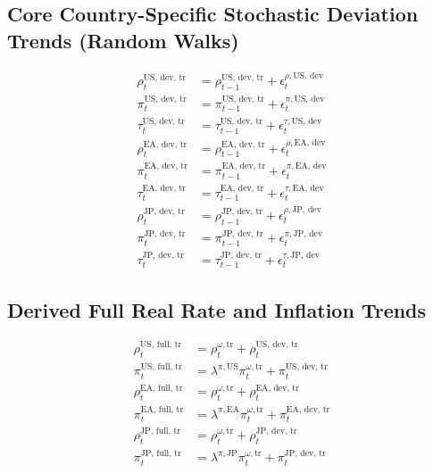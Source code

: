 \documentclass{article}
\begin{document}
\subsection*{Core Country-Specific Stochastic Deviation Trends (Random Walks)}
\begin{align}
    \rho^{\text{US, dev, tr}}_t &= \rho^{\text{US, dev, tr}}_{t-1} + \epsilon^{\rho, \text{US, dev}}_t \\
    \pi^{\text{US, dev, tr}}_t &= \pi^{\text{US, dev, tr}}_{t-1} + \epsilon^{\pi, \text{US, dev}}_t \\
    \tau^{\text{US, dev, tr}}_t &= \tau^{\text{US, dev, tr}}_{t-1} + \epsilon^{\tau, \text{US, dev}}_t \\
    \rho^{\text{EA, dev, tr}}_t &= \rho^{\text{EA, dev, tr}}_{t-1} + \epsilon^{\rho, \text{EA, dev}}_t \\
    \pi^{\text{EA, dev, tr}}_t &= \pi^{\text{EA, dev, tr}}_{t-1} + \epsilon^{\pi, \text{EA, dev}}_t \\
    \tau^{\text{EA, dev, tr}}_t &= \tau^{\text{EA, dev, tr}}_{t-1} + \epsilon^{\tau, \text{EA, dev}}_t \\
    \rho^{\text{JP, dev, tr}}_t &= \rho^{\text{JP, dev, tr}}_{t-1} + \epsilon^{\rho, \text{JP, dev}}_t \\
    \pi^{\text{JP, dev, tr}}_t &= \pi^{\text{JP, dev, tr}}_{t-1} + \epsilon^{\pi, \text{JP, dev}}_t \\
    \tau^{\text{JP, dev, tr}}_t &= \tau^{\text{JP, dev, tr}}_{t-1} + \epsilon^{\tau, \text{JP, dev}}_t
\end{align}

\subsection*{Derived Full Real Rate and Inflation Trends}
\begin{align}
    \rho^{\text{US, full, tr}}_t &= \rho^{\omega, \text{tr}}_t + \rho^{\text{US, dev, tr}}_t \\
    \pi^{\text{US, full, tr}}_t &= \lambda^{\pi, \text{US}} \pi^{\omega, \text{tr}}_t + \pi^{\text{US, dev, tr}}_t \\
    \rho^{\text{EA, full, tr}}_t &= \rho^{\omega, \text{tr}}_t + \rho^{\text{EA, dev, tr}}_t \\
    \pi^{\text{EA, full, tr}}_t &= \lambda^{\pi, \text{EA}} \pi^{\omega, \text{tr}}_t + \pi^{\text{EA, dev, tr}}_t \\
    \rho^{\text{JP, full, tr}}_t &= \rho^{\omega, \text{tr}}_t + \rho^{\text{JP, dev, tr}}_t \\
    \pi^{\text{JP, full, tr}}_t &= \lambda^{\pi, \text{JP}} \pi^{\omega, \text{tr}}_t + \pi^{\text{JP, dev, tr}}_t
\end{align}
\end{document}
